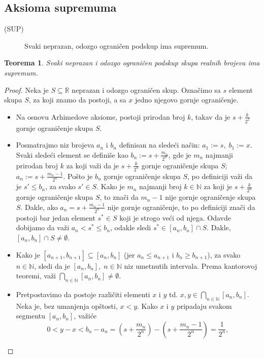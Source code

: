 \documentclass[a4paper,12pt]{article}
\theoremstyle{plain}
\newtheorem{theorem}{Teorema}[section]
\theoremstyle{definition}
\theoremstyle{remark}
\begin{document}
\subsection{Aksioma supremuma}
\begin{description}
    \item[(SUP)] Svaki neprazan, odozgo ograničen podskup ima supremum.
\end{description}
\begin{theorem}
    Svaki neprazan i odozgo ograničen podskup skupa realnih brojeva ima supremum.
\end{theorem}
\begin{proof} Neka je $S \subseteq \mathbb{R}$ neprazan i odozgo ograničen skup. Označimo
sa $s$ element skupa $S$, za koji znamo da postoji, a sa $x$ jedno njegovo gornje ograničenje.
\begin{itemize}
    \item Na osnovu Arhimedove aksiome, postoji prirodan broj $k$, takav da je $s + \frac{k}{2^2}$ gornje ograničenje skupa $S$. 
    \item Posmatrajmo niz brojeva $a_n$ i $b_n$ definisan na sledeći način: $a_1 := s,
    \; b_1 := x$. Svaki sledeći element se definiše kao $b_n := s + \frac{m_n}{2^n}$, gde je $m_n$ najmanji
    prirodan broj $k$ za koji važi da je $s + \frac{k}{2^n}$ gornje ograničenje skupa $S$; $a_n := s + \frac{m_n-1}{2^n}$.
    Pošto je $b_n$ gornje ograničenje skupa $S$, po definiciji važi da je $s' \leq b_n$, za svako $s' \in S$.
    Kako je $m_n$ najmanji broj $k \in \mathbb{N}$ za koji je $s + \frac{k}{2^n}$ gornje ograničenje skupa $S$, to znači da
    $m_n - 1$ nije gornje ograničenje skupa $S$. Dakle, ako $a_n = s + \frac{m_n-1}{2^n}$ nije gornje ograničenje, 
    to po definiciji znači da postoji bar jedan element $s^* \in S$ koji je strogo veći od njega. Odavde dobijamo da važi 
    $a_n < s^* \leq b_n$, odakle sledi $s^* \in [a_n, b_n] \cap S$. Dakle, $[a_n, b_n] \cap S \neq \emptyset$.
    \item Kako je $[a_{n+1}, b_{n+1}] \subseteq [a_n, b_n]$ (jer $a_n \leq a_{n+1}$ i $b_n \geq b_{n+1}$), za svako $n \in \mathbb{N}$, sledi da je $[a_n, b_n],\;n\in \mathbb{N}$ niz 
    umetnutih intervala. Prema kantorovoj teoremi, važi $\bigcap_{n \in \mathbb{N}} [a_n, b_n] \neq \emptyset$. 
    \item Pretpostavimo da postoje različiti elementi $x$ i $y$ td.
    $x, y \in \bigcap_{n \in \mathbb{N}} [a_n, b_n]$. Neka je, bez umanjenja opštosti, $x < y$. Kako $x$ i $y$ pripadaju svakom
    segmentu $[a_n, b_n]$, važiće \[0 < y-x < b_n - a_n = \left(s + \frac{m_n}{2^n}\right) - \left(s + \frac{m_n - 1}{2^n}\right) = \frac{1}{2^n},\]

\end{itemize}
\end{proof}
\end{document}
